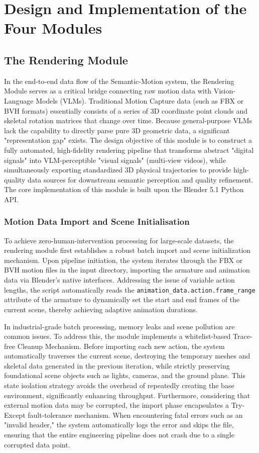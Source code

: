 \documentclass[11pt,oneside]{report}
\begin{document}
\chapter{Design and Implementation of the Four Modules}
\section{The Rendering Module}
In the end-to-end data flow of the Semantic-Motion system, the Rendering Module serves as a critical bridge connecting raw motion data with Vision-Language Models (VLMs). Traditional Motion Capture data (such as FBX or BVH formats) essentially consists of a series of 3D coordinate point clouds and skeletal rotation matrices that change over time. Because general-purpose VLMs lack the capability to directly parse pure 3D geometric data, a significant "representation gap" exists. The design objective of this module is to construct a fully automated, high-fidelity rendering pipeline that transforms abstract "digital signals" into VLM-perceptible "visual signals" (multi-view videos), while simultaneously exporting standardized 3D physical trajectories to provide high-quality data sources for downstream semantic perception and quality refinement. The core implementation of this module is built upon the Blender 5.1 Python API.

\subsection{Motion Data Import and Scene Initialisation}
To achieve zero-human-intervention processing for large-scale datasets, the rendering module first establishes a robust batch import and scene initialization mechanism. Upon pipeline initiation, the system iterates through the FBX or BVH motion files in the input directory, importing the armature and animation data via Blender's native interfaces. Addressing the issue of variable action lengths, the script automatically reads the \texttt{animation\_data.action.frame\_range} attribute of the armature to dynamically set the start and end frames of the current scene, thereby achieving adaptive animation durations.

In industrial-grade batch processing, memory leaks and scene pollution are common issues. To address this, the module implements a whitelist-based Trace-free Cleanup Mechanism. Before importing each new action, the system automatically traverses the current scene, destroying the temporary meshes and skeletal data generated in the previous iteration, while strictly preserving foundational scene objects such as lights, cameras, and the ground plane. This state isolation strategy avoids the overhead of repeatedly creating the base environment, significantly enhancing throughput. Furthermore, considering that external motion data may be corrupted, the import phase encapsulates a Try-Except fault-tolerance mechanism. When encountering fatal errors such as an "invalid header," the system automatically logs the error and skips the file, ensuring that the entire engineering pipeline does not crash due to a single corrupted data point.
\end{document}
